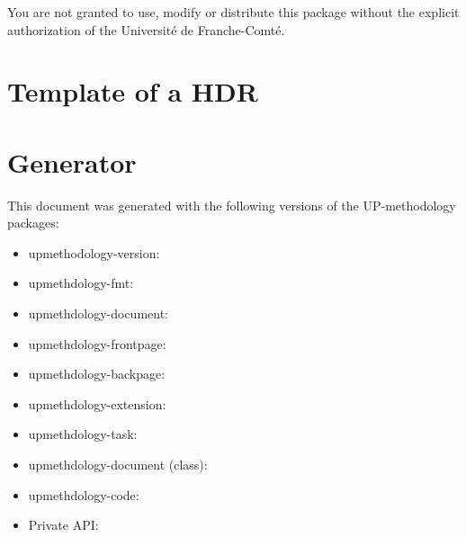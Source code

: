 \documentclass[english]{spimufchdr}
\makeatletter
\let\VERversion\upm@package@version@ver
\let\VERfmt\upm@package@fmt@ver
\let\VERdoc\upm@package@doc@ver
\let\VERfp\upm@package@fp@ver
\let\VERbp\upm@package@bp@ver
\let\VERext\upm@package@ext@ver
\let\VERtask\upm@package@task@ver
\let\VERdocclazz\upm@package@docclazz@ver
\let\VERcode\upm@package@code@ver
\let\VERcommon\upm@package@private@doctype@ver
\makeatother
\begin{document}
You are not granted to use, modify or distribute this package without the explicit authorization of the Universit\'e de Franche-Comt\'e.

\chapter{Template of a HDR}



\chapter{Generator}

This document was generated with the following versions of the UP-methodology packages:
\begin{itemize}
\item upmethodology-version: \VERversion
\item upmethdology-fmt: \VERfmt
\item upmethdology-document: \VERdoc
\item upmethdology-frontpage: \VERfp
\item upmethdology-backpage: \VERbp
\item upmethdology-extension: \VERext
\item upmethdology-task: \VERtask
\item upmethdology-document (class): \VERdocclazz
\item upmethdology-code: \VERcode
\item Private API: \VERcommon
\end{itemize}
\end{document}
